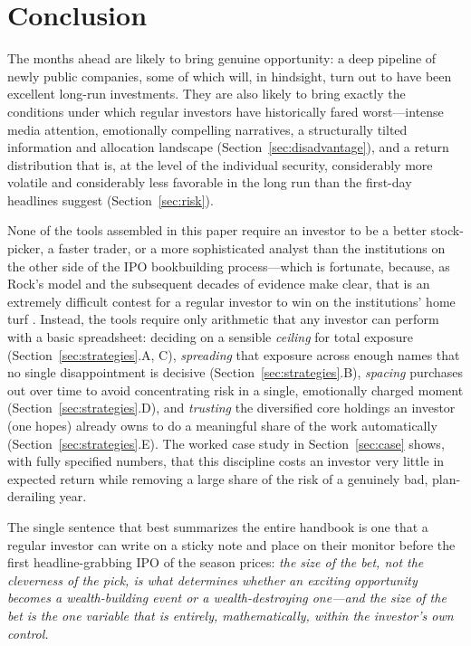 \documentclass[conference]{IEEEtran}
\begin{document}
\section{Conclusion}
\label{sec:conclusion}

The months ahead are likely to bring genuine opportunity: a deep pipeline of newly public companies, some of which will, in hindsight, turn out to have been excellent long-run investments. They are also likely to bring exactly the conditions under which regular investors have historically fared worst---intense media attention, emotionally compelling narratives, a structurally tilted information and allocation landscape (Section~\ref{sec:disadvantage}), and a return distribution that is, at the level of the individual security, considerably more volatile and considerably less favorable in the long run than the first-day headlines suggest (Section~\ref{sec:risk}).

None of the tools assembled in this paper require an investor to be a better stock-picker, a faster trader, or a more sophisticated analyst than the institutions on the other side of the IPO bookbuilding process---which is fortunate, because, as Rock's model and the subsequent decades of evidence make clear, that is an extremely difficult contest for a regular investor to win on the institutions' home turf \cite{rock1986,ritter1991}. Instead, the tools require only arithmetic that any investor can perform with a basic spreadsheet: deciding on a sensible \emph{ceiling} for total exposure (Section~\ref{sec:strategies}.A, C), \emph{spreading} that exposure across enough names that no single disappointment is decisive (Section~\ref{sec:strategies}.B), \emph{spacing} purchases out over time to avoid concentrating risk in a single, emotionally charged moment (Section~\ref{sec:strategies}.D), and \emph{trusting} the diversified core holdings an investor (one hopes) already owns to do a meaningful share of the work automatically (Section~\ref{sec:strategies}.E). The worked case study in Section~\ref{sec:case} shows, with fully specified numbers, that this discipline costs an investor very little in expected return while removing a large share of the risk of a genuinely bad, plan-derailing year.

The single sentence that best summarizes the entire handbook is one that a regular investor can write on a sticky note and place on their monitor before the first headline-grabbing IPO of the season prices: \emph{the size of the bet, not the cleverness of the pick, is what determines whether an exciting opportunity becomes a wealth-building event or a wealth-destroying one---and the size of the bet is the one variable that is entirely, mathematically, within the investor's own control.}
\end{document}
